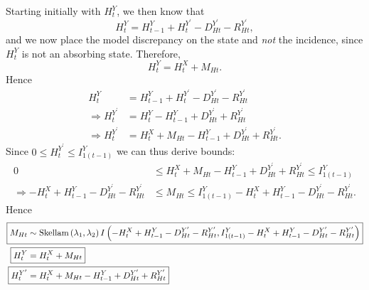 \documentclass[a4paper]{article}
\begin{document}
Starting initially with $H^Y_t$, we then know that
\begin{equation*}
    H^Y_t = H^Y_{t - 1} + H^{Y^\prime}_t - D^{Y^\prime}_{Ht} - R^{Y^\prime}_{Ht},
\end{equation*}
and we now place the model discrepancy on the state and \textit{not} the incidence, since $H^Y_t$ is not an absorbing state. Therefore, 
\begin{equation*}
    H^Y_t = H^X_t + M_{Ht}.
\end{equation*}
Hence
\begin{align*}
    H^Y_t &= H^Y_{t - 1} + H^{Y^\prime}_t - D^{Y^\prime}_{Ht} - R^{Y^\prime}_{Ht}\\
    \Rightarrow H^{Y^\prime}_t &= H^Y_t - H^Y_{t - 1} + D^{Y^\prime}_{Ht} + R^{Y^\prime}_{Ht}\\
    \Rightarrow H^{Y^\prime}_t &= H^X_t + M_{Ht} - H^Y_{t - 1} + D^{Y^\prime}_{Ht} + R^{Y^\prime}_{Ht}.
\end{align*}
Since $0 \leq H^{Y^\prime}_t \leq I^Y_{1(t - 1)}$ we can thus derive bounds:
\begin{align*}
    0 &\leq H^X_t + M_{Ht} - H^Y_{t - 1} + D^{Y^\prime}_{Ht} + R^{Y^\prime}_{Ht} \leq I^Y_{1(t - 1)}\\
    \Rightarrow -H^X_t + H^Y_{t - 1} - D^{Y^\prime}_{Ht} - R^{Y^\prime}_{Ht} &\leq M_{Ht} \leq I^Y_{1(t - 1)} -H^X_t + H^Y_{t - 1} - D^{Y^\prime}_{Ht} - R^{Y^\prime}_{Ht}.
\end{align*}
Hence
\begin{align*}
\Aboxed{M_{Ht} &\sim \mbox{Skellam}\left(\lambda_1, \lambda_2\right)I\left(-H^X_t + H^Y_{t - 1} - D^{Y^\prime}_{Ht} - R^{Y^\prime}_{Ht}, I^Y_{1(t - 1)} -H^X_t + H^Y_{t - 1} - D^{Y^\prime}_{Ht} - R^{Y^\prime}_{Ht}\right)}\\
    \Aboxed{H^Y_{t} &= H^X_{t} + M_{Ht}}\\
    \Aboxed{H^{Y^\prime}_{t} &= H^X_t + M_{Ht} - H^Y_{t - 1} + D^{Y^\prime}_{Ht} + R^{Y^\prime}_{Ht}}
\end{align*}
\end{document}

